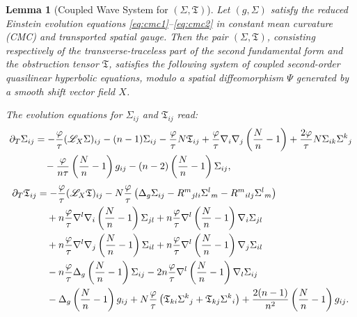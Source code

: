 \documentclass{amsart}
\newtheorem{lemma}{Lemma}[section]
\begin{document}
\begin{lemma}[Coupled Wave System for \((\Sigma, \mathfrak{T})\)]
\label{evolutionsystem}
Let \( (g, \Sigma) \) satisfy the reduced Einstein evolution equations \eqref{eq:cmc1}--\eqref{eq:cmc2} in constant mean curvature (CMC) and transported spatial gauge. Then the pair \( (\Sigma, \mathfrak{T}) \), consisting respectively of the transverse-traceless part of the second fundamental form and the obstruction tensor $\mathfrak{T}$, satisfies the following system of coupled second-order quasilinear hyperbolic equations, modulo a spatial diffeomorphism \( \Psi \) generated by a smooth shift vector field \( X \).

\noindent The evolution equations for \( \Sigma_{ij} \) and \( \mathfrak{T}_{ij} \) read:
\begin{align}
\partial_T \Sigma_{ij} &= -\frac{\varphi}{\tau} (\mathscr{L}_X \Sigma)_{ij} 
- (n-1) \Sigma_{ij}
- \frac{\varphi}{\tau} N \mathfrak{T}_{ij} 
+ \frac{\varphi}{\tau} \nabla_i \nabla_j \left( \frac{N}{n} - 1 \right) 
+ \frac{2\varphi}{\tau} N \Sigma_{ik} \Sigma^k{}_j \notag\\
&\quad - \frac{\varphi}{n\tau} \left( \frac{N}{n} - 1 \right) g_{ij} 
- (n-2) \left( \frac{N}{n} - 1 \right) \Sigma_{ij}, \label{eq:sigma_evol}
\end{align}
\begin{align}
\partial_T \mathfrak{T}_{ij} &= -\frac{\varphi}{\tau} (\mathscr{L}_X \mathfrak{T})_{ij} 
- N \frac{\varphi}{\tau} \left( \Delta_g \Sigma_{ij} - R^m{}_{jli} \Sigma^l{}_m - R^m{}_{ilj} \Sigma^l{}_m \right) \notag\\
&\quad + n \frac{\varphi}{\tau} \nabla^l \nabla_i \left( \frac{N}{n} - 1 \right) \Sigma_{jl} 
+ n \frac{\varphi}{\tau} \nabla^l \left( \frac{N}{n} - 1 \right) \nabla_i \Sigma_{jl} \notag\\
&\quad + n \frac{\varphi}{\tau} \nabla^l \nabla_j \left( \frac{N}{n} - 1 \right) \Sigma_{il}
+ n \frac{\varphi}{\tau} \nabla^l \left( \frac{N}{n} - 1 \right) \nabla_j \Sigma_{il} \notag\\
&\quad - n \frac{\varphi}{\tau} \Delta_g \left( \frac{N}{n} - 1 \right) \Sigma_{ij}
- 2n \frac{\varphi}{\tau} \nabla^l \left( \frac{N}{n} - 1 \right) \nabla_l \Sigma_{ij} \notag\\
&\quad - \Delta_g \left( \frac{N}{n} - 1 \right) g_{ij}
+ N \frac{\varphi}{\tau} \left( \mathfrak{T}_{ki} \Sigma^k{}_j + \mathfrak{T}_{kj} \Sigma^k{}_i \right)
+ \frac{2(n-1)}{n^2} \left( \frac{N}{n} - 1 \right) g_{ij}. \label{eq:T_evol}
\end{align}
\end{lemma}
\end{document}
